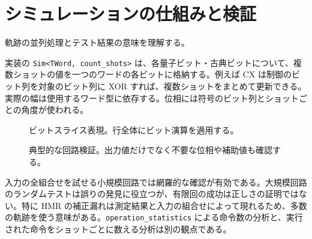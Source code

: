 \documentclass[a4paper,11pt,oneside,openany]{ltjsbook}
\newcommand{\code}[1]{\nolinkurl{#1}}
\begin{document}
\chapter{シミュレーションの仕組みと検証}
\begin{goal}軌跡の並列処理とテスト結果の意味を理解する。\end{goal}
実装の \code{Sim<TWord, count_shots>} は、各量子ビット・古典ビットについて、複数ショットの値を一つのワードの各ビットに格納する。例えば CX は制御のビット列を対象のビット列に XOR すれば、複数ショットをまとめて更新できる。実際の幅は使用するワード型に依存する。位相には符号のビット列とショットごとの角度が使われる。
\begin{figure}[htbp]\centering
{}\caption{ビットスライス表現。行全体にビット演算を適用する。}\end{figure}
\begin{figure}[htbp]\centering
{}\caption{典型的な回路検証。出力値だけでなく不要な位相や補助値も確認する。}\end{figure}
入力の全組合せを試せる小規模回路では網羅的な確認が有効である。大規模回路のランダムテストは誤りの発見に役立つが、有限回の成功は正しさの証明ではない。特に HMR の補正漏れは測定結果と入力の組合せによって現れるため、多数の軌跡を使う意味がある。\code{operation_statistics} による命令数の分析と、実行された命令をショットごとに数える分析は別の観点である。
\end{document}
